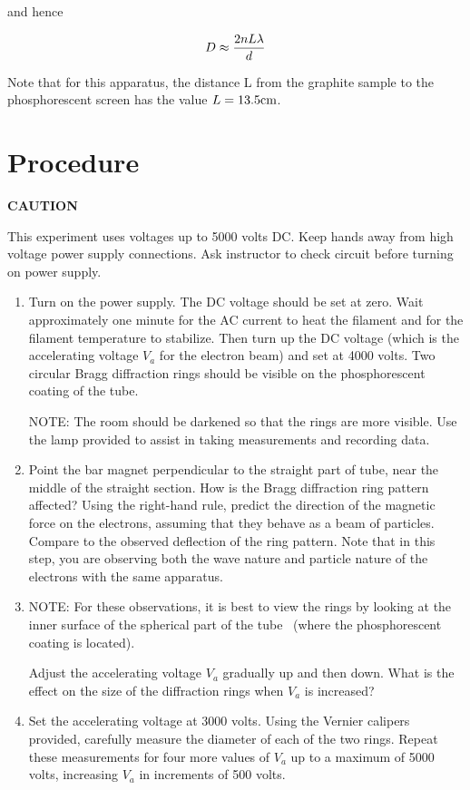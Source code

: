 and hence

\begin{equation}
D \approx {2nL\lambda\over d}     
\end{equation}

Note that for this apparatus, the distance L from the graphite sample to
the phosphorescent screen has the value $L = 13.5 {\rm cm} $.

\section{Procedure }

\begin{centering}
{\bf CAUTION}
\end{centering}

This experiment uses voltages up to 5000 volts DC.
Keep hands away from high voltage power supply
connections.  Ask instructor to check circuit before
turning on power supply.

\begin{enumerate}
\item Turn on the power supply. The DC voltage should be set at zero.
Wait approximately one minute for the AC current to heat the filament
and for the filament temperature to stabilize.  Then turn up the DC
voltage (which is the accelerating voltage $V_a$ for the
electron beam) and set at 4000 volts.  Two circular Bragg diffraction
rings should be visible on the phosphorescent coating of the tube.

NOTE: The room should be darkened so that the rings are more visible.
 Use the lamp provided to assist in taking measurements and recording
data.

\item Point the bar magnet perpendicular to the straight part of tube,
near the middle of the straight section.  How is the Bragg diffraction
ring pattern affected?  Using the right-hand rule, predict the
direction of the magnetic force on the electrons, assuming that they
behave as a beam of particles.  Compare to the observed deflection of
the ring pattern.  Note that in this step, you are observing both
the wave nature and particle nature of the electrons with the same
apparatus.

\item NOTE: For these observations, it is best to view the rings by
looking at the inner surface of the spherical part of the tube \ (where
the phosphorescent coating is located).

Adjust the accelerating voltage $V_a$  gradually up and
then down.  What is the effect on the size of the diffraction rings
when $V_a$ is increased?

\item Set the accelerating voltage at 3000 volts.  Using the Vernier
calipers provided, carefully measure the diameter of each of the two rings.  Repeat these
measurements for four more values of $V_a$ up to a
maximum of 5000 volts, increasing $V_a$ in increments of
500 volts.
\end{enumerate}

